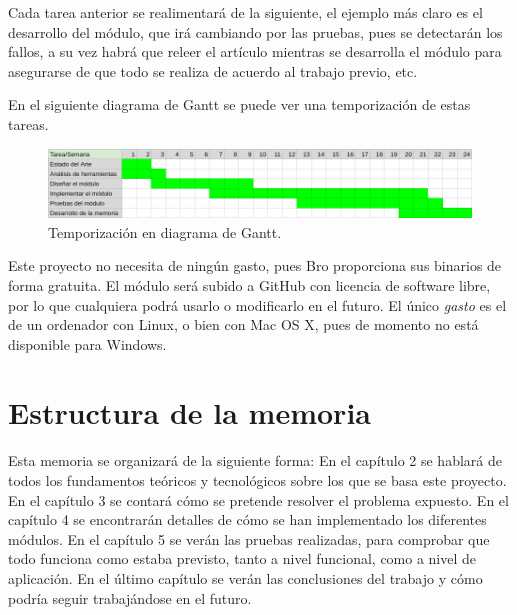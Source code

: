 Cada tarea anterior se realimentará de la siguiente, el ejemplo más claro es el desarrollo del módulo, que 
irá cambiando por las pruebas, pues se detectarán los fallos, a su vez habrá que releer el artículo mientras 
se desarrolla el módulo para asegurarse de que todo se realiza de acuerdo al trabajo previo, etc.

\intro En el siguiente diagrama de Gantt se puede ver una temporización de estas tareas. 

\begin{figure}[H]
  \includegraphics[width=1\textwidth]{imagenes/temporizacion.png} 
  \centering
  \caption{Temporización en diagrama de Gantt.}
\end{figure}

Este proyecto no necesita de ningún gasto, pues Bro \cite{broindex} proporciona sus binarios de 
forma gratuita. El módulo será subido a GitHub \cite{repo} con licencia de software libre, por lo que cualquiera 
podrá usarlo o modificarlo en el futuro. El único \textit{gasto} es el de un ordenador con Linux, 
o bien con Mac OS X, pues de momento no está disponible para Windows. \cite{brodownload}

\section{Estructura de la memoria}

Esta memoria se organizará de la siguiente forma: En el capítulo 2 se hablará de 
todos los fundamentos teóricos y tecnológicos sobre los que se basa este proyecto. 
En el capítulo 3 se contará cómo se pretende resolver el problema expuesto. En el 
capítulo 4 se encontrarán detalles de cómo se han implementado los diferentes módulos. 
En el capítulo 5 se verán las pruebas realizadas, para comprobar que todo funciona como 
estaba previsto, tanto a nivel funcional, como a nivel de aplicación. En el último capítulo 
se verán las conclusiones del trabajo y cómo podría seguir trabajándose en el futuro.
